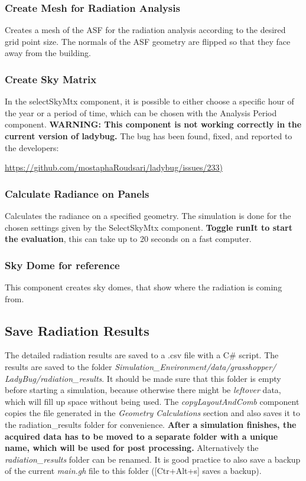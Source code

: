 		\subsubsection{Create Mesh for Radiation Analysis}
		Creates a mesh of the ASF for the radiation analysis according to the desired grid point size. The normals of the ASF geometry are flipped so that they face away from the building. 

		\subsubsection{Create Sky Matrix}
		In the selectSkyMtx component, it is possible to either choose a specific hour of the year or a period of time, which can be chosen with the Analysis Period component. {\bf WARNING: This component is not working correctly in the current version of ladybug.} The bug has been found, fixed, and reported to the developers:

		\url{https://github.com/mostaphaRoudsari/ladybug/issues/233)}

		\subsubsection{Calculate Radiance on Panels}
		Calculates the radiance on a specified geometry. The simulation is done for the chosen settings given by the SelectSkyMtx component. {\bf Toggle runIt to start the evaluation}, this can take up to 20 seconds on a fast computer. 

		\subsubsection{Sky Dome for reference}
		This component creates sky domes, that show where the radiation is coming from. 



	\subsection{Save Radiation Results}
	The detailed radiation results are saved to a .csv file with a C\# script. The results are saved to the folder \emph{Simulation\_Environment/data/grasshopper/ LadyBug/radiation\_results}. It should be made sure that this folder is empty before starting a simulation, because otherwise there might be \emph{leftover} data, which will fill up space without being used. The \emph{copyLayoutAndComb} component copies the file generated in the \emph{Geometry Calculations} section and also saves it to the radiation\_results folder for convenience. {\bf After a simulation finishes, the acquired data has to be moved to a separate folder with a unique name, which will be used for post processing.} Alternatively the \emph{radiation\_results} folder can be renamed. It is good practice to also save a backup of the current \emph{main.gh} file to this folder ([Ctr+Alt+s] saves a backup). 


